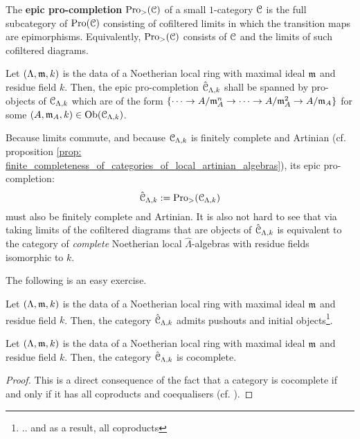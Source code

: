             \begin{definition} \label{def: epic_pro_objects}
                The \textbf{epic pro-completion} $\mathrm{Pro}
                _>(\mathcal{C})$ of a small $1$-category $\mathcal{C}$ is the full subcategory of $\mathrm{Pro}(\mathcal{C})$ consisting of cofiltered limits in which the transition maps are epimorphisms. Equivalently, $\mathrm{Pro}
                _>(\mathcal{C})$ consists of $\mathcal{C}$ and the limits of such cofiltered diagrams.  
            \end{definition}
            \begin{example} \label{example: completed_artinian_local_algebras}
                Let $(\Lambda, \mathfrak{m}, k)$ is the data of a Noetherian local ring with maximal ideal $\mathfrak{m}$ and residue field $k$. Then, the epic pro-completion $\hat{\mathcal{C}}_{\Lambda, k}$ shall be spanned by pro-objects of $\mathcal{C}_{\Lambda, k}$ which are of the form $\{\cdots \to A/\mathfrak{m}_A^n \to \cdots \to A/\mathfrak{m}_A^2 \to A/\mathfrak{m}_A\}$ for some $(A, \mathfrak{m}_A, k) \in \mathrm{Ob}(\mathcal{C}_{\Lambda, k})$. 
                
                Because limits commute, and because $\mathcal{C}_{\Lambda, k}$ is finitely complete and Artinian (cf. proposition \ref{prop: finite_completeness_of_categories_of_local_artinian_algebras}), its epic pro-completion:
                    $$\hat{\mathcal{C}}_{\Lambda, k} := \mathrm{Pro}_>(\mathcal{C}_{\Lambda, k})$$
                must also be finitely complete and Artinian. It is also not hard to see that via taking limits of the cofiltered diagrams that are objects of $\hat{\mathcal{C}}_{\Lambda, k}$ is equivalent to the category of \textit{complete} Noetherian local $\hat{\Lambda}$-algebras with residue fields isomorphic to $k$.
            \end{example}
            The following is an easy exercise. 
            \begin{proposition} \label{prop: pushouts_and_coproducts_of_completed_artinian_local_algebras}
                Let $(\Lambda, \mathfrak{m}, k)$ is the data of a Noetherian local ring with maximal ideal $\mathfrak{m}$ and residue field $k$. Then, the category $\hat{\mathcal{C}}_{\Lambda, k}$ admits pushouts and initial objects\footnote{.. and as a result, all coproducts}.
            \end{proposition}
            \begin{corollary}
                Let $(\Lambda, \mathfrak{m}, k)$ is the data of a Noetherian local ring with maximal ideal $\mathfrak{m}$ and residue field $k$. Then, the category $\hat{\mathcal{C}}_{\Lambda, k}$ is cocomplete.
            \end{corollary}
                \begin{proof}
                    This is a direct consequence of the fact that a category is cocomplete if and only if it has all coproducts and coequalisers (cf. \cite[Theorem V.2.1]{maclane}).
                \end{proof}
                
